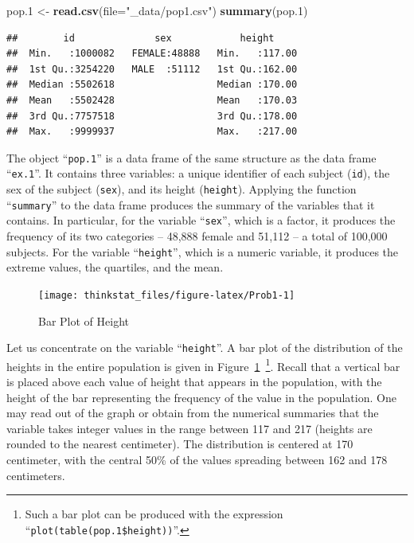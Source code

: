 \documentclass[]{krantz}
\makeatletter
\newenvironment{Shaded}{\begin{snugshade}}{\end{snugshade}}
\newcommand{\KeywordTok}[1]{\textcolor[rgb]{0.13,0.29,0.53}{\textbf{#1}}}
\newcommand{\DataTypeTok}[1]{\textcolor[rgb]{0.13,0.29,0.53}{#1}}
\newcommand{\DecValTok}[1]{\textcolor[rgb]{0.00,0.00,0.81}{#1}}
\newcommand{\StringTok}[1]{\textcolor[rgb]{0.31,0.60,0.02}{#1}}
\newcommand{\NormalTok}[1]{#1}
\newenvironment{kframe}{%
\medskip{}
\setlength{\fboxsep}{.8em}
 \def\at@end@of@kframe{}%
 \ifinner\ifhmode%
  \def\at@end@of@kframe{\end{minipage}}%
  \begin{minipage}{\columnwidth}%
 \fi\fi%
 \def\FrameCommand##1{\hskip\@totalleftmargin \hskip-\fboxsep
 \colorbox{shadecolor}{##1}\hskip-\fboxsep
     \hskip-\linewidth \hskip-\@totalleftmargin \hskip\columnwidth}%
 \MakeFramed {\advance\hsize-\width
   \@totalleftmargin\z@ \linewidth\hsize
   \@setminipage}}%
 {\par\unskip\endMakeFramed%
 \at@end@of@kframe}
\renewenvironment{Shaded}{\begin{kframe}}{\end{kframe}}
\theoremstyle{definition}
\theoremstyle{definition}
\theoremstyle{definition}
\theoremstyle{remark}
\makeatother
\begin{document}
\begin{Shaded}
\begin{Highlighting}[]
\NormalTok{pop.}\DecValTok{1}\NormalTok{ <-}\StringTok{ }\KeywordTok{read.csv}\NormalTok{(}\DataTypeTok{file=}\StringTok{"_data/pop1.csv"}\NormalTok{)}
\KeywordTok{summary}\NormalTok{(pop.}\DecValTok{1}\NormalTok{)}
\end{Highlighting}
\end{Shaded}

\begin{verbatim}
##        id              sex            height      
##  Min.   :1000082   FEMALE:48888   Min.   :117.00  
##  1st Qu.:3254220   MALE  :51112   1st Qu.:162.00  
##  Median :5502618                  Median :170.00  
##  Mean   :5502428                  Mean   :170.03  
##  3rd Qu.:7757518                  3rd Qu.:178.00  
##  Max.   :9999937                  Max.   :217.00
\end{verbatim}

The object ``\texttt{pop.1}'' is a data frame of the same structure as
the data frame ``\texttt{ex.1}''. It contains three variables: a unique
identifier of each subject (\texttt{id}), the sex of the subject
(\texttt{sex}), and its height (\texttt{height}). Applying the function
``\texttt{summary}'' to the data frame produces the summary of the
variables that it contains. In particular, for the variable
``\texttt{sex}'', which is a factor, it produces the frequency of its
two categories -- 48,888 female and 51,112 -- a total of 100,000
subjects. For the variable ``\texttt{height}'', which is a numeric
variable, it produces the extreme values, the quartiles, and the mean.

\begin{figure}

{\centering \texttt{[image: thinkstat\_files/figure-latex/Prob1-1]} 

}

\caption{Bar Plot of Height}\label{fig:Prob1}
\end{figure}

Let us concentrate on the variable ``\texttt{height}''. A bar plot of
the distribution of the heights in the entire population is given in
Figure~\ref{fig:Prob1}~\footnote{Such a bar plot can be produced with
  the expression ``\texttt{plot(table(pop.1\$height))}''.}. Recall that
a vertical bar is placed above each value of height that appears in the
population, with the height of the bar representing the frequency of the
value in the population. One may read out of the graph or obtain from
the numerical summaries that the variable takes integer values in the
range between 117 and 217 (heights are rounded to the nearest
centimeter). The distribution is centered at 170 centimeter, with the
central 50\% of the values spreading between 162 and 178 centimeters.
\end{document}
